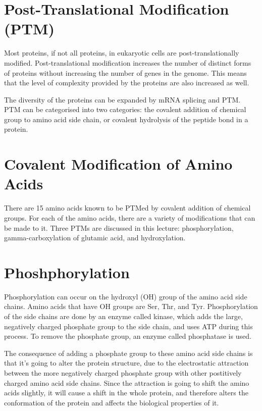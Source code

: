 \section{Post-Translational Modification (PTM)}

Most proteins, if not all proteins, in eukaryotic cells are post-translationally modified.
Post-translational modification increases the number of distinct forms of proteins without increasing the number of genes in the genome.
This means that the level of complexity provided by the proteins are also increased as well.

The diversity of the proteins can be expanded by mRNA splicing and PTM.
PTM can be categorised into two categories: the covalent addition of chemical group to amino acid side chain, or covalent hydrolysis of the peptide bond in a protein.

\section{Covalent Modification of Amino Acids}

There are 15 amino acids known to be PTMed by covalent addition of chemical groups.
For each of the amino acids, there are a variety of modifications that can be made to it.
Three PTMs are discussed in this lecture: phosphorylation, gamma-carboxylation of glutamic acid, and hydroxylation.

\section{Phoshphorylation}

Phosphorylation can occur on the hydroxyl (OH) group of the amino acid side chains.
Amino acids that have OH groups are Ser, Thr, and Tyr.
Phosphorylation of the side chains are done by an enzyme called kinase, which adds the large, negatively charged phosphate group to the side chain, and uses ATP during this process.
To remove the phosphate group, an enzyme called phosphatase is used.

The consequence of adding a phosphate group to these amino acid side chains is that it's going to alter the protein structure, due to the electrostatic attraction between the more negatively charged phosphate group with other postitively charged amino acid side chains.
Since the attraction is going to shift the amino acids slightly, it will cause a shift in the whole protein, and therefore alters the conformation of the protein and affects the biological properties of it.

